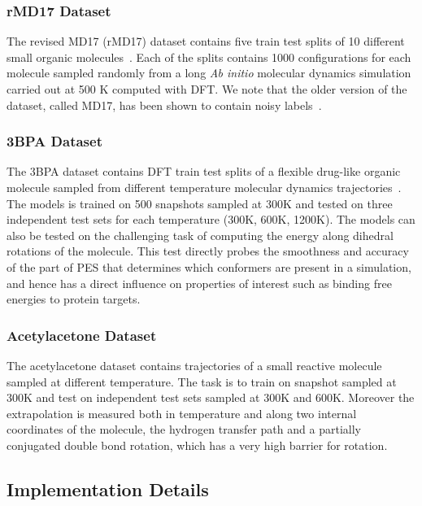 \documentclass{article}
\begin{document}
\subsubsection{rMD17 Dataset}
The revised MD17 (rMD17) dataset contains five train test splits of 10 different small organic molecules~\cite{Christensen2020}. Each of the splits contains 1000 configurations for each molecule sampled randomly from a long \textit{Ab initio} molecular dynamics simulation carried out at 500 K computed with DFT. We note that the older version of the dataset, called MD17, has been shown to contain noisy labels~\cite{Christensen2020}.
\subsubsection{3BPA Dataset}
The 3BPA dataset contains DFT train test splits of a flexible drug-like organic molecule sampled from different temperature molecular dynamics trajectories~\cite{kovacs2021}. The models is trained on 500 snapshots sampled at 300K and tested on three independent test sets for each temperature (300K, 600K, 1200K). The models can also be tested on the challenging task of computing the energy along dihedral rotations of the molecule. This test directly probes the smoothness and accuracy of the part of PES that determines which conformers are present in a simulation, and hence has a direct influence on properties of interest such as binding free energies to protein targets.

\subsubsection{Acetylacetone Dataset}
The acetylacetone dataset contains trajectories of a small reactive molecule sampled at different temperature. The task is to train on snapshot sampled at 300K and test on independent test sets sampled at 300K and 600K.
Moreover the extrapolation is measured both in temperature and along two internal coordinates of the molecule, the hydrogen transfer path and a partially conjugated double bond rotation, which has a very high barrier for rotation.
\subsection{Implementation Details}
\label{sec:implementation}

\end{document}
